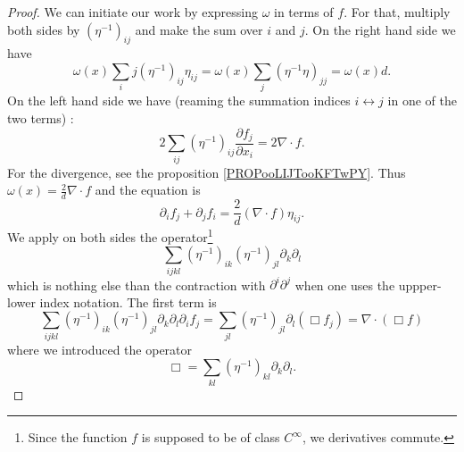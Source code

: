 \begin{proof}
    We can initiate our work by expressing \( \omega\) in terms of \( f\). For that, multiply both sides by \( (\eta^{-1})_{ij}\) and make the sum over \( i\) and \( j\). On the right hand side we have
    \begin{equation}
        \omega(x)\sum_ij(\eta^{-1})_{ij}\eta_{ij}=\omega(x)\sum_j(\eta^{-1}\eta)_{jj}=\omega(x)d.
    \end{equation}
    On the left hand side we have (reaming the summation indices \( i\leftrightarrow j\) in one of the two terms) :
    \begin{equation}
        2\sum_{ij}(\eta^{-1})_{ij}\frac{ \partial  f_j }{ \partial x_i }=2\nabla\cdot  f.
    \end{equation}
    For the divergence, see the proposition \ref{PROPooLIJTooKFTwPY}. Thus \( \omega(x)=\frac{ 2 }{ d }\nabla\cdot f\) and the equation is
    \begin{equation}    \label{EQooAPOPooBdKskD}
        \partial_i f_j+\partial_j f_i=\frac{ 2 }{ d }(\nabla\cdot f)\eta_{ij}.
    \end{equation}
    We apply on both sides the operator\footnote{Since the function \( f\) is supposed to be of class \(  C^{\infty}\), we derivatives commute.}
    \begin{equation}
        \sum_{ijkl}(\eta^{-1})_{ik}(\eta^{-1})_{jl}\partial_k\partial_l
    \end{equation}
    which is nothing else than the contraction with \( \partial^i\partial^j\) when one uses the uppper-lower index notation.
    The first term is
    \begin{equation}
        \sum_{ijkl}(\eta^{-1})_{ik}(\eta^{-1})_{jl}\partial_k\partial_l\partial_i f_j=\sum_{jl}(\eta^{-1})_{jl}\partial_l(\Box  f_j)=\nabla\cdot(\Box f)
    \end{equation}
    where we introduced the operator
    \begin{equation}
        \Box=\sum_{kl}(\eta^{-1})_{kl}\partial_k\partial_l.
    \end{equation}


\end{proof}
